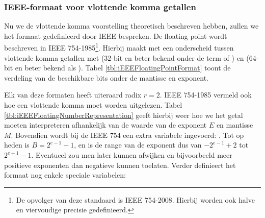 \subsubsection{IEEE-formaat voor vlottende komma getallen}
Nu we de vlottende komma voorstelling theoretisch beschreven hebben, zullen we het formaat gedefinieerd door IEEE bespreken. De floating point wordt beschreven in IEEE 754-1985\footnote{De opvolger van deze standaard is IEEE 754-2008\cite{5976968}. Hierbij worden ook halve en viervoudige precisie gedefinieerd.}\cite{30711}. Hierbij maakt met een onderscheid tussen vlottende komma getallen met  (32-bit en beter bekend onder de term  of ) en  (64-bit en beter bekend als ). Tabel \ref{tbl:iEEEFloatingPointFormat} toont de verdeling van de beschikbare bits onder de mantisse en exponent.
\begin{table}[hbt]
\centering
{}
\caption{IEEE 754-1985 Floating Point.}
\label{tbl:iEEEFloatingPoint}
\end{table}
Elk van deze formaten heeft uiteraard radix $r=2$. IEEE 754-1985 vermeld ook hoe een vlottende komma moet worden uitgelezen. Tabel \ref{tbl:iEEEFloatingNumberRepresentation} geeft hierbij weer hoe we het getal moeten interpreteren afhankelijk van de waarde van de exponent $E$ en mantisse $M$. Bovendien wordt bij de IEEE 754 een extra variabele ingevoerd: . Tot op heden is $B=2^{e-1}-1$, en is de range van de exponent dus van $-2^{e-1}+2$ tot $2^{e-1}-1$. Eventueel zou men later kunnen afwijken en bijvoorbeeld meer positieve exponenten dan negatieve kunnen toelaten. Verder definieert het formaat nog enkele speciale variabelen:
